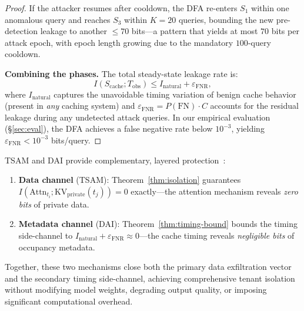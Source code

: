 \begin{proof}
If the attacker resumes after cooldown, the DFA re-enters $S_1$ within one anomalous
query and reaches $S_3$ within $K = 20$ queries, bounding the new pre-detection leakage
to another $\leq 70$ bits---a pattern that yields at most $70$ bits per attack epoch,
with epoch length growing due to the mandatory $100$-query cooldown.

\medskip
\noindent\textbf{Combining the phases.}
The total steady-state leakage rate is:
\begin{equation}
    I(S_{\mathrm{cache}}; T_{\mathrm{obs}}) \leq I_{\mathrm{natural}} + \varepsilon_{\mathrm{FNR}},
\end{equation}
where $I_{\mathrm{natural}}$ captures the unavoidable timing variation of benign cache
behavior (present in \emph{any} caching system) and
$\varepsilon_{\mathrm{FNR}} = P(\text{FN}) \cdot C$ accounts for the residual leakage
during any undetected attack queries. In our empirical evaluation (\S\ref{sec:eval}),
the DFA achieves a false negative rate below $10^{-3}$, yielding
$\varepsilon_{\mathrm{FNR}} < 10^{-3}$ bits/query.
\end{proof}

\begin{remark}
\label{rem:defense-in-depth}
TSAM and DAI provide complementary, layered protection~\cite{denning1976lattice, goguen1982security}:
\begin{enumerate}[leftmargin=1.5em,itemsep=2pt]
    \item \textbf{Data channel} (TSAM): Theorem~\ref{thm:isolation} guarantees
          $I(\mathrm{Attn}_{t_i}; \mathrm{KV}_{\mathrm{private}}(t_j)) = 0$ exactly---the
          attention mechanism reveals \emph{zero bits} of private data.
    \item \textbf{Metadata channel} (DAI): Theorem~\ref{thm:timing-bound} bounds the
          timing side-channel to $I_{\mathrm{natural}} + \varepsilon_{\mathrm{FNR}}
          \approx 0$---the cache timing reveals \emph{negligible bits} of occupancy
          metadata.
\end{enumerate}
Together, these two mechanisms close both the primary data exfiltration vector and the
secondary timing side-channel, achieving comprehensive tenant isolation without modifying
model weights, degrading output quality, or imposing significant computational overhead.
\end{remark}
